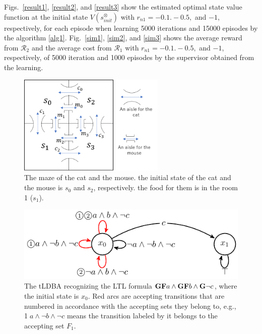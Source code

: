 \documentclass[a4j,12pt,oneside,openany,english,dvipdfmx]{jsbook}
\begin{document}
Figs.\ \ref{result1}, \ref{result2}, and \ref{result3} show the estimated optimal state value function at the initial state $V(s^{\otimes}_{init})$ with $r_{n1} = -0.1. -0.5,$ and $-1$, respectively, for each episode when learning 5000 iterations and 15000 episodes by the algorithm \ref{alg1}.
Fig.\ \ref{sim1}, \ref{sim2}, and \ref{sim3} shows the average reward from $\mathcal{R}_2$ and the average cost from $\mathcal{R}_1$ with $r_{n1} = -0.1. -0.5,$ and $-1$, respectively, of 5000 iteration and 1000 episodes by the supervisor obtained from the learning.

\begin{figure}[htbp]
   \centering
   \vspace{2mm}
   \includegraphics[width=7cm]{cat_mouse.png}
   \caption{The maze of the cat and the mouse. the initial state of the cat and the mouse is $s_0$ and $s_2$, respectively. the food for them is in the room 1 ($s_1$).}
   \label{cat_mouse}
\end{figure}

\begin{figure}[htbp]
   \centering
   \vspace{2mm}
   \includegraphics[bb=0 0 247 80,scale=0.85]{ldgba_original.pdf}
   \caption{The tLDBA recognizing the LTL formula $\text{{\bf GF}}a \wedge \text{{\bf GF}}b \wedge \text{{\bf G}}\neg c$, where the initial state is $x_0$. Red arcs are accepting transitions that are numbered in accordance with the accepting sets they belong to, e.g., \textcircled{\scriptsize 1}$a \land \neg b \land \neg c$ means the transition labeled by it belongs to the accepting set $F_1$.}
   \label{tldba}
\end{figure}
\end{document}
